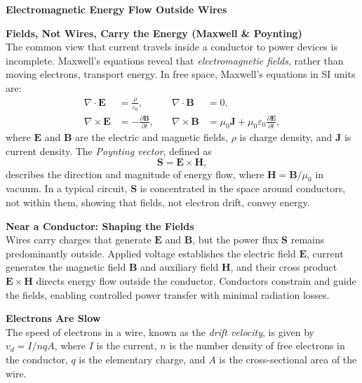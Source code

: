 \begin{technical}
{\Large\textbf{Electromagnetic Energy Flow Outside Wires}}

\noindent\textbf{Fields, Not Wires, Carry the Energy (Maxwell \& Poynting)}\\[0.5em]
The common view that current travels inside a conductor to power devices is incomplete. Maxwell’s equations reveal that \textit{electromagnetic fields}, rather than moving electrons, transport energy. In free space, Maxwell’s equations in SI units are:
\begin{align*}
\nabla \cdot \mathbf{E} &= \frac{\rho}{\varepsilon_0}, 
&\quad \nabla \cdot \mathbf{B} &= 0,\\
\nabla \times \mathbf{E} &= -\frac{\partial \mathbf{B}}{\partial t},
&\quad \nabla \times \mathbf{B} &= \mu_0 \mathbf{J} + \mu_0 \varepsilon_0 \frac{\partial \mathbf{E}}{\partial t},
\end{align*}
where \(\mathbf{E}\) and \(\mathbf{B}\) are the electric and magnetic fields, \(\rho\) is charge density, and \(\mathbf{J}\) is current density. The \textit{Poynting vector}, defined as
\[
\mathbf{S} = \mathbf{E} \times \mathbf{H},
\]
describes the direction and magnitude of energy flow, where \(\mathbf{H} = \mathbf{B}/\mu_0\) in vacuum. In a typical circuit, \(\mathbf{S}\) is concentrated in the space around conductors, not within them, showing that fields, not electron drift, convey energy.

\vspace{0.7em}
\noindent\textbf{Near a Conductor: Shaping the Fields}\\[0.5em]
Wires carry charges that generate \(\mathbf{E}\) and \(\mathbf{B}\), but the power flux \(\mathbf{S}\) remains predominantly outside. Applied voltage establishes the electric field \(\mathbf{E}\), current generates the magnetic field \(\mathbf{B}\) and auxiliary field \(\mathbf{H}\), and their cross product \(\mathbf{E} \times \mathbf{H}\) directs energy flow outside the conductor. Conductors constrain and guide the fields, enabling controlled power transfer with minimal radiation losses.

\vspace{0.7em}
\noindent\textbf{Electrons Are Slow}\\[0.5em]
The speed of electrons in a wire, known as the \textit{drift velocity}, is given by $v_d = I/n q A$, where \( I \) is the current, \( n \) is the number density of free electrons in the conductor, \( q \) is the elementary charge, and \( A \) is the cross-sectional area of the wire.


\end{technical}
